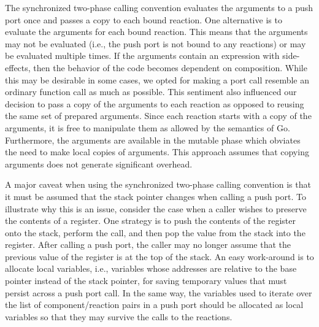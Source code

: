 The synchronized two-phase calling convention evaluates the arguments to a push port once and passes a copy to each bound reaction.
One alternative is to evaluate the arguments for each bound reaction.
This means that the arguments may not be evaluated (i.e., the push port is not bound to any reactions) or may be evaluated multiple times.
If the arguments contain an expression with side-effects, then the behavior of the code becomes dependent on composition.
While this may be desirable in some cases, we opted for making a port call resemble an ordinary function call as much as possible.
This sentiment also influenced our decision to pass a copy of the arguments to each reaction as opposed to reusing the same set of prepared arguments.
Since each reaction starts with a copy of the arguments, it is free to manipulate them as allowed by the semantics of Go.
Furthermore, the arguments are available in the mutable phase which obviates the need to make local copies of arguments.
This approach assumes that copying arguments does not generate significant overhead.


A major caveat when using the synchronized two-phase calling convention is that it must be assumed that the stack pointer changes when calling a push port.
To illustrate why this is an issue, consider the case when a caller wishes to preserve the contents of a register.
One strategy is to push the contents of the register onto the stack, perform the call, and then pop the value from the stack into the register.
After calling a push port, the caller may no longer assume that the previous value of the register is at the top of the stack.
An easy work-around is to allocate local variables, i.e., variables whose addresses are relative to the base pointer instead of the stack pointer, for saving temporary values that must persist across a push port call.
In the same way, the variables used to iterate over the list of component/reaction pairs in a push port should be allocated as local variables so that they may survive the calls to the reactions.

